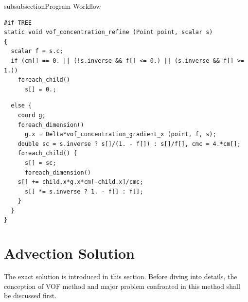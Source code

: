\begin{codesection}{subsubsection}{Program Workflow}
\begin{verbatim}
#if TREE
static void vof_concentration_refine (Point point, scalar s)
{
  scalar f = s.c;
  if (cm[] == 0. || (!s.inverse && f[] <= 0.) || (s.inverse && f[] >= 1.))
    foreach_child()
      s[] = 0.;
\end{verbatim}
\codearrow
{}
\begin{verbatim}
  else {
    coord g;
    foreach_dimension()
      g.x = Delta*vof_concentration_gradient_x (point, f, s);
    double sc = s.inverse ? s[]/(1. - f[]) : s[]/f[], cmc = 4.*cm[];
    foreach_child() {
      s[] = sc;
      foreach_dimension()
	s[] += child.x*g.x*cm[-child.x]/cmc;
      s[] *= s.inverse ? 1. - f[] : f[];
    }
  }
}
\end{verbatim}
\end{codesection}

\section{Advection Solution}
The exact solution is introduced in this section. Before diving into details, the conception of VOF method and major problem confronted in this method shall be discussed first.
